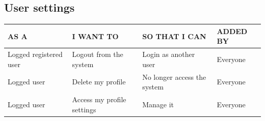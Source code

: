 \documentclass[11pt, a4paper]{article}
\begin{document}
\subsection{User settings}
\begin{table}[H]
    \centering
    \begin{tabular}{|p{4cm}|p{4.5cm}|p{5cm}|p{3cm}|}
    \hline
    \rowcolor[HTML]{EFEFEF} 
    AS A                    & I WANT TO                      & SO THAT I CAN                     & ADDED BY \\ \hline
    Logged registered user  & Logout from the system         & Login as another user             & Everyone \\ \hline
    Logged user             & Delete my profile              & No longer access the system       & Everyone \\ \hline
    Logged user             & Access my profile settings     & Manage it                         & Everyone \\ \hline
    \end{tabular}
\end{table}
\begin{figure}[H]
    \centering
\end{figure}
\end{document}
